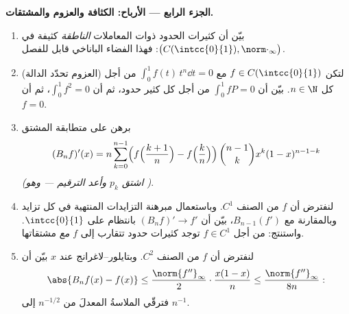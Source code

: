 \begin{problem}
\medskip
\noindent\textbf{الجزء الرابع --- الأرباح: الكثافة والعزوم
والمشتقات.}
\begin{enumerate}[resume]
  \item بيّن أن كثيرات الحدود ذوات المعاملات \emph{الناطقة}
        كثيفة في $\bigl(C(\intcc{0}{1}),
        \norm\cdot_\infty\bigr)$: فهذا الفضاء الباناخي
        قابل للفصل.
  \item (العزوم تحدّد الدالة) لتكن $f \in
        C(\intcc{0}{1})$ مع $\int_0^1 f(t)\,t^n \dd t = 0$
        من أجل كل $n \in \N$. بيّن أن $\int_0^1 f P = 0$ من أجل كل
        كثير حدود، ثم أن $\int_0^1 f^2 = 0$، ثم أن $f = 0$.
  \item برهن على متطابقة المشتق
        \[
        (B_nf)'(x) = n\sum_{k=0}^{n-1}\Bigl(
        f\Bigl(\frac{k+1}{n}\Bigr) -
        f\Bigl(\frac kn\Bigr)\Bigr)\,
        \binom{n-1}{k}x^k(1-x)^{n-1-k}
        \]
        \emph{(اشتق $p_k$ وأعد الترقيم --- وهو )}.
  \item لنفترض أن $f$ من الصنف $C^1$. وباستعمال مبرهنة التزايدات المنتهية في
        كل تزايد وبالمقارنة مع $B_{n-1}(f')$، بيّن أن
        $(B_nf)' \to f'$ بانتظام على $\intcc{0}{1}$. واستنتج:
        من أجل $f \in C^1$ توجد كثيرات حدود تتقارب إلى $f$
        \emph{مع} مشتقاتها.
  \item لنفترض أن $f$ من الصنف $C^2$. وبتايلور--لاغرانج عند $x$ بيّن أن
        \[
        \abs{B_nf(x) - f(x)} \leq
        \frac{\norm{f''}_\infty}{2}\cdot\frac{x(1-x)}{n}
        \leq \frac{\norm{f''}_\infty}{8n} :
        \]
        فترقّي الملاسةُ المعدلَ من $n^{-1/2}$ إلى
        $n^{-1}$.
\end{enumerate}


\end{problem}
